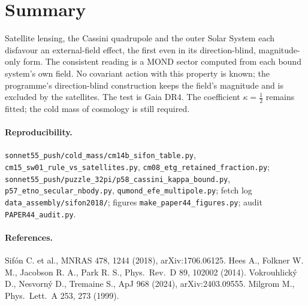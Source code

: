 \documentclass[10pt]{article}
\newcommand{\fpath}[1]{\nolinkurl{#1}}
\begin{document}
\section{Summary}
Satellite lensing, the Cassini quadrupole and the outer Solar System each disfavour an external-field effect, the first even in its direction-blind, magnitude-only form. The consistent reading is a MOND sector computed from each bound system's own field. No covariant action with this property is known; the programme's direction-blind construction keeps the field's magnitude and is excluded by the satellites. The test is Gaia DR4. The coefficient $\kappa=\tfrac12$ remains fitted; the cold mass of cosmology is still required.

\paragraph{Reproducibility.} \fpath{sonnet55_push/cold_mass/cm14b_sifon_table.py}, \fpath{cm15_sw01_rule_vs_satellites.py}, \fpath{cm08_etg_retained_fraction.py}; \fpath{sonnet55_push/puzzle_32pi/p58_cassini_kappa_bound.py}, \fpath{p57_etno_secular_nbody.py}, \fpath{qumond_efe_multipole.py}; fetch log \fpath{data_assembly/sifon2018/}; figures \fpath{make_paper44_figures.py}; audit \fpath{PAPER44_audit.py}.

\small
\paragraph{References.}
Sif\'on C. et al., MNRAS 478, 1244 (2018), arXiv:1706.06125.
Hees A., Folkner W. M., Jacobson R. A., Park R. S., Phys.\ Rev.\ D 89, 102002 (2014).
Vokrouhlick\'y D., Nesvorn\'y D., Tremaine S., ApJ 968 (2024), arXiv:2403.09555.
Milgrom M., Phys.\ Lett.\ A 253, 273 (1999).
\end{document}
